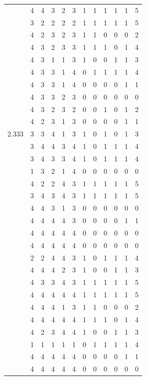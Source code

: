 \documentclass[]{msu-thesis}
\theoremstyle{definition}
\theoremstyle{definition}
\theoremstyle{definition}
\theoremstyle{remark}
\begin{document}
\begin{table}
{\begin{tabular}[t]{rrrrrrrrrrrr}
 & 4 & 4 & 3 & 2 & 3 & 1 & 1 & 1 & 1 & 1 & 5\\
 & 3 & 2 & 2 & 2 & 2 & 1 & 1 & 1 & 1 & 1 & 5\\
 & 4 & 2 & 3 & 2 & 3 & 1 & 1 & 0 & 0 & 0 & 2\\
 & 4 & 3 & 2 & 3 & 3 & 1 & 1 & 1 & 0 & 1 & 4\\
 & 4 & 3 & 1 & 1 & 3 & 1 & 0 & 0 & 1 & 1 & 3\\
 & 4 & 3 & 3 & 1 & 4 & 0 & 1 & 1 & 1 & 1 & 4\\
 & 4 & 3 & 3 & 1 & 4 & 0 & 0 & 0 & 0 & 1 & 1\\
 & 4 & 3 & 3 & 2 & 3 & 0 & 0 & 0 & 0 & 0 & 0\\
 & 4 & 3 & 2 & 3 & 2 & 0 & 0 & 1 & 0 & 1 & 2\\
 & 4 & 2 & 3 & 1 & 3 & 0 & 0 & 0 & 0 & 1 & 1\\
2.333 & 3 & 3 & 4 & 1 & 3 & 1 & 0 & 1 & 0 & 1 & 3\\
 & 3 & 4 & 4 & 3 & 4 & 1 & 0 & 1 & 1 & 1 & 4\\
 & 3 & 4 & 3 & 3 & 4 & 1 & 0 & 1 & 1 & 1 & 4\\
 & 1 & 3 & 2 & 1 & 4 & 0 & 0 & 0 & 0 & 0 & 0\\
 & 4 & 2 & 2 & 4 & 3 & 1 & 1 & 1 & 1 & 1 & 5\\
 & 3 & 4 & 3 & 4 & 3 & 1 & 1 & 1 & 1 & 1 & 5\\
 & 4 & 4 & 3 & 1 & 3 & 0 & 0 & 0 & 0 & 0 & 0\\
 & 4 & 4 & 4 & 4 & 3 & 0 & 0 & 0 & 0 & 1 & 1\\
 & 4 & 4 & 4 & 4 & 4 & 0 & 0 & 0 & 0 & 0 & 0\\
 & 4 & 4 & 4 & 4 & 4 & 0 & 0 & 0 & 0 & 0 & 0\\
 & 2 & 2 & 4 & 4 & 3 & 1 & 0 & 1 & 1 & 1 & 4\\
 & 4 & 4 & 4 & 2 & 3 & 1 & 0 & 0 & 1 & 1 & 3\\
 & 4 & 3 & 3 & 4 & 3 & 1 & 1 & 1 & 1 & 1 & 5\\
 & 4 & 4 & 4 & 4 & 4 & 1 & 1 & 1 & 1 & 1 & 5\\
 & 4 & 4 & 4 & 1 & 3 & 1 & 1 & 0 & 0 & 0 & 2\\
 & 4 & 4 & 4 & 4 & 4 & 1 & 1 & 1 & 0 & 1 & 4\\
 & 4 & 2 & 3 & 4 & 4 & 1 & 0 & 0 & 1 & 1 & 3\\
 & 1 & 1 & 1 & 1 & 1 & 0 & 1 & 1 & 1 & 1 & 4\\
 & 4 & 4 & 4 & 4 & 4 & 0 & 0 & 0 & 0 & 1 & 1\\
 & 4 & 4 & 4 & 4 & 4 & 0 & 0 & 0 & 0 & 0 & 0\\

\end{tabular}}
\end{table}
\end{document}
